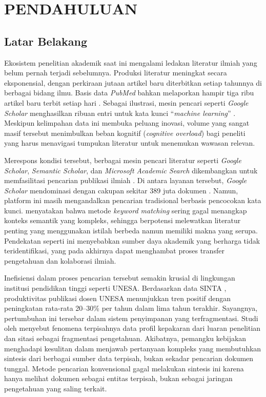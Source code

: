 \chapter{PENDAHULUAN}

\section{Latar Belakang}

Ekosistem penelitian akademik saat ini mengalami ledakan literatur ilmiah yang belum pernah terjadi sebelumnya. Produksi literatur meningkat secara eksponensial, dengan perkiraan jutaan artikel baru diterbitkan setiap tahunnya di berbagai bidang ilmu. Basis data \textit{PubMed} bahkan melaporkan hampir tiga ribu artikel baru terbit setiap hari \citep{lee2016best}. Sebagai ilustrasi, mesin pencari seperti \textit{Google Scholar} menghasilkan ribuan entri untuk kata kunci ``\textit{machine learning}'' \citep{Khalid2019OnTC}. Meskipun kelimpahan data ini membuka peluang inovasi, volume yang sangat masif tersebut menimbulkan beban kognitif (\textit{cognitive overload}) bagi peneliti yang harus menavigasi tumpukan literatur untuk menemukan wawasan relevan.

Merespons kondisi tersebut, berbagai mesin pencari literatur seperti \textit{Google Scholar}, \textit{Semantic Scholar}, dan \textit{Microsoft Academic Search} dikembangkan untuk memfasilitasi pencarian publikasi ilmiah \citep{MartinMartin2021}. Di antara layanan tersebut, \textit{Google Scholar} mendominasi dengan cakupan sekitar 389 juta dokumen \citep{Gusenbauer2018Google}. Namun, platform ini masih mengandalkan pencarian tradisional berbasis pencocokan kata kunci. \citet{deerwester1990indexing} menyatakan bahwa metode \textit{keyword matching} sering gagal menangkap konteks semantik yang kompleks, sehingga berpotensi melewatkan literatur penting yang menggunakan istilah berbeda namun memiliki makna yang serupa. Pendekatan seperti ini menyebabkan sumber daya akademik yang berharga tidak teridentifikasi, yang pada akhirnya dapat menghambat proses transfer pengetahuan dan kolaborasi ilmiah.

Inefisiensi dalam proses pencarian tersebut semakin krusial di lingkungan institusi pendidikan tinggi seperti UNESA. Berdasarkan data SINTA \citep{sinta_unesa2024}, produktivitas publikasi dosen UNESA menunjukkan tren positif dengan peningkatan rata-rata 20--30\% per tahun dalam lima tahun terakhir. Sayangnya, pertumbuhan ini tersebar dalam sistem penyimpanan yang terfragmentasi. Studi oleh \citet{9320965} menyebut fenomena terpisahnya data profil kepakaran dari luaran penelitian dan sitasi sebagai fragmentasi pengetahuan. Akibatnya, pemangku kebijakan menghadapi kesulitan dalam menjawab pertanyaan kompleks yang membutuhkan sintesis dari berbagai sumber data terpisah, bukan sekadar pencarian dokumen tunggal. Metode pencarian konvensional gagal melakukan sintesis ini karena hanya melihat dokumen sebagai entitas terpisah, bukan sebagai jaringan pengetahuan yang saling terkait.

